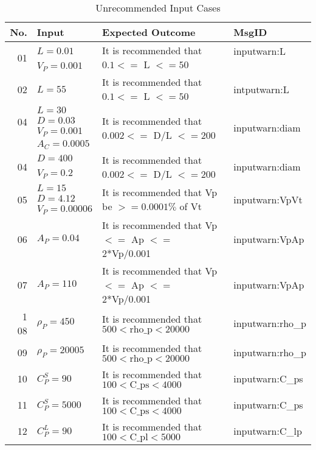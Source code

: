 \documentclass[12pt]{article}
\begin{document}
\begin{center}
	\begin{longtable}{ | r | p{3cm} | p{5cm} | p{4cm} |}
	\caption{Unrecommended Input Cases} \\ \hline \label{TblUnrecommendedInput} 
	No. & Input & Expected Outcome & MsgID \\ \hline
	\multirow{2}{*}{01} & $L = 0.01$ & \multirow{2}{*}{\parbox{5cm}{It is recommended that $0.1 <=$ L $<= 50$}}& inputwarn:L\\ 
	& $V_P = 0.001$ & & \\ \hline
	02 & $L = 55$ & It is recommended that $0.1 <=$ L $<= 50$ & intputwarn:L\\ \hline
    \multirow{3}{*}{04} & $L = 30$ & \multirow{4}{*}{\parbox{5cm}{It is recommended that $0.002 <=$ D/L $<= 200$}} & \multirow{4}{*}{inputwarn:diam} \\
    & $D = 0.03$ & & \\
    & $V_P = 0.001$ & & \\
    & $A_C = 0.0005$ & & \\ \hline
	\multirow{2}{*}{04} & $D = 400$ & \multirow{2}{*}{\parbox{5cm}{It is recommended that $0.002 <=$ D/L $<= 200$}} & \multirow{2}{*}{inputwarn:diam}\\
	& $V_P = 0.2$ & & \\ \hline
	\multirow{3}{*}{05} & $L = 15$ & \multirow{3}{*}{\parbox{5cm}{It is recommended that Vp be $>= 0.0001\%$ of Vt}} & \multirow{3}{*}{inputwarn:VpVt}\\ 
	& $D = 4.12$ & & \\
	& $V_P = 0.00006$ & & \\ \hline
	06 & $A_P = 0.04$ & It is recommended that Vp $<=$ Ap $<=$ 2*Vp/0.001 & inputwarn:VpAp \\ \hline
	07 & $A_P = 110$ & It is recommended that Vp $<=$ Ap $<=$ 2*Vp/0.001 & inputwarn:VpAp \\ \hline1
	08 & $\rho_P = 450$ & It is recommended that $500 < \text{rho\_{p}} < 20000$ &inputwarn:rho\_{p} \\ \hline
	09 & $\rho_P = 20005$ & It is recommended that $500 < \text{rho\_{p}} < 20000$ & inputwarn:rho\_{p}\\ \hline
	10 & $C^S_P = 90$ & It is recommended that $100 < \text{C\_{ps}} < 4000$ & inputwarn:C\_{ps}\\ \hline
	11 & $C^S_P = 5000$ & It is recommended that $100 < \text{C\_{ps}} < 4000$ & inputwarn:C\_{ps}\\ \hline
	12 & $C^L_P = 90$ & It is recommended that $100 < \text{C\_{pl}} < 5000$ & inputwarn:C\_{lp} \\ \hline

\end{longtable}
\end{center}
\end{document}
